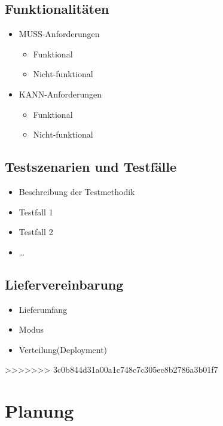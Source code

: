 \subsection{Funktionalitäten}
\begin{itemize}
	\item MUSS-Anforderungen
	\begin{itemize}
		\item Funktional
		\item Nicht-funktional
	\end{itemize}
	\item KANN-Anforderungen
	\begin{itemize}
		\item Funktional
		\item Nicht-funktional
	\end{itemize}
\end{itemize}
\subsection{Testszenarien und Testfälle}
\begin{itemize}
	\item Beschreibung der Testmethodik
	\item Testfall 1
	\item Testfall 2
	\item \ldots
\end{itemize}
\subsection{Liefervereinbarung}
\begin{itemize}
	\item Lieferumfang
	\item Modus
	\item Verteilung(Deployment)
\end{itemize}
>>>>>>> 3c0b844d31a00a1c748c7c305ec8b2786a3b01f7

\section{Planung}
